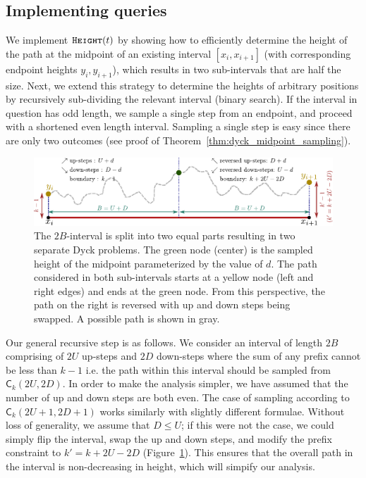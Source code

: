\subsection{Implementing  queries}
\label{sec:implementing_height_queries}
We implement $\texttt{\textsc{Height}}(t)$ by showing how to efficiently determine the height of the path
at the midpoint of an existing interval $[x_i, x_{i+1}]$ (with corresponding endpoint heights $y_i, y_{i+1}$),
which results in two sub-intervals that are half the size.
Next, we extend this strategy to determine the heights of arbitrary positions by recursively sub-dividing the relevant interval (binary search).
If the interval in question has odd length, we sample a single step from an endpoint, and proceed with a shortened even length interval.
Sampling a single step is easy since there are only two outcomes (see proof of Theorem~\ref{thm:dyck_midpoint_sampling}).
\begin{figure}[htpb]
    \centering
    \includegraphics[width=\textwidth]{images/dyck_height_sampling.pdf}
    \caption{The $2B$-interval is split into two equal parts resulting in two separate Dyck problems.
             The green node (center) is the sampled height of the midpoint parameterized by the value of $d$.
             The path considered in both sub-intervals starts at a yellow node (left and right edges) and ends at the green node.
             From this perspective, the path on the right is reversed with up and down steps being swapped.
             A possible path is shown in gray.}
    \label{fig:dyck_height_sampling}
\end{figure}

Our general recursive step is as follows.
We consider an interval of length $2B$ comprising of $2U$ up-steps and $2D$ down-steps where the sum of any prefix cannot be less than $k-1$
i.e. the path within this interval should be sampled from $\mathsf C_k(2U,2D)$.
In order to make the analysis simpler, we have assumed that the number of up and down steps are both even.
The case of sampling according to $\mathsf C_k(2U+1, 2D+1)$ works similarly with slightly different formulae.
Without loss of generality, we assume that $D\le U$; if this were not the case, we could simply flip the interval,
swap the up and down steps, and modify the prefix constraint to $k'=k+2U-2D$ (Figure~\ref{fig:dyck_height_sampling}).
This ensures that the overall path in the interval is non-decreasing in height, which will simpify our analysis.


